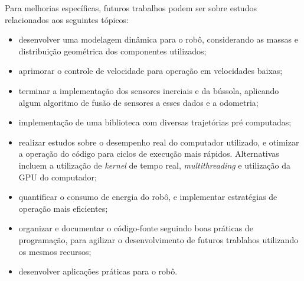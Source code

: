Para melhorias específicas, futuros trabalhos podem ser sobre estudos relacionados aos seguintes tópicos:
\begin{itemize}
  \item{desenvolver uma modelagem dinâmica para o robô, considerando as massas e distribuição geométrica dos componentes utilizados;}
  \item{aprimorar o controle de velocidade para operação em velocidades baixas;}
  \item{terminar a implementação dos sensores inerciais e da bússola, aplicando algum algoritmo de fusão de sensores a esses dados e a odometria;}
  \item{implementação de uma biblioteca com diversas trajetórias pré computadas;}
  \item{realizar estudos sobre o desempenho real do computador utilizado, e otimizar a operação do código para ciclos de execução mais rápidos. Alternativas incluem a utilização de \textit{kernel} de tempo real, \textit{multithreading} e utilização da GPU do computador;}
  \item{quantificar o consumo de energia do robô, e implementar estratégias de operação mais eficientes;}
  \item{organizar e documentar o código-fonte seguindo boas práticas de programação, para agilizar o desenvolvimento de futuros trablahos utilizando os mesmos recursos;}
  \item{desenvolver aplicações práticas para o robô.}
\end{itemize}
